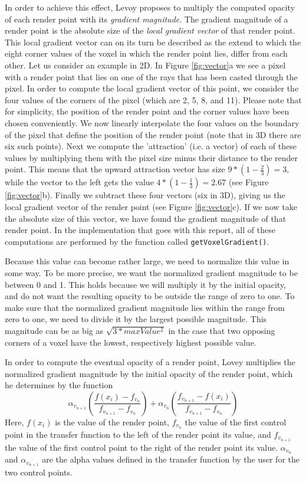 In order to achieve this effect, Levoy proposes to multiply the computed opacity of each render point with its \textit{gradient magnitude}. The gradient magnitude of a render point is the absolute size of the \textit{local gradient vector} of that render point. This local gradient vector can on its turn be described as the extend to which the eight corner values of the voxel in which the render point lies, differ from each other. Let us consider an example in 2D. In Figure \ref{fig:vector}a we see a pixel with a render point that lies on one of the rays that has been casted through the pixel. In order to compute the local gradient vector of this point, we consider the four values of the corners of the pixel (which are 2, 5, 8, and 11). Please note that for simplicity, the position of the render point and the corner values have been chosen conveniently. We now linearly interpolate the four values on the boundary of the pixel that define the position of the render point (note that in 3D there are six such points). Next we compute the 'attraction' (i.e. a vector) of each of these values by multiplying them with the pixel size minus their distance to the render point. This means that the upward attraction vector has size $9*(1-\frac{2}{3})=3$, while the vector to the left gets the value $4*(1-\frac{1}{3})=2.67$ (see Figure \ref{fig:vector}b). Finally we subtract these four vectors (six in 3D), giving us the local gradient vector of the render point (see Figure \ref{fig:vector}c). If we now take the absolute size of this vector, we have found the gradient magnitude of that render point. In the implementation that goes with this report, all of these computations are performed by the function called \texttt{getVoxelGradient()}.

Because this value can become rather large, we need to normalize this value in some way. To be more precise, we want the normalized gradient magnitude to be between 0 and 1. This holds because we will multiply it by the initial opacity, and do not want the resulting opacity to be outside the range of zero to one. To make sure that the normalized gradient magnitude lies within the range from zero to one, we need to divide it by the largest possible magnitude. This magnitude can be as big as $\sqrt{3*maxValue^2}$ in the case that two opposing corners of a voxel have the lowest, respectively highest possible value.

In order to compute the eventual opacity of a render point, Lovey multiplies the normalized gradient magnitude by the initial opacity of the render point, which he determines by the function
\[
\alpha_{v_{n+1}} \left(\frac{f(x_i)-f_{v_n}}{f_{v_{n+1}}-f_{v_n}}\right) + \alpha_{v_n} \left(\frac{f_{v_{n+1}}-f(x_i)}{f_{v_{n+1}}-f_{v_n}}\right)
\]
 Here, $f(x_i)$ is the value of the render point, $f_{v_n}$ the value of the first control point in the transfer function to the left of the render point its value, and $f_{v_{n+1}}$ the value of the first control point to the right of the render point its value. $\alpha_{v_n}$ and $\alpha_{v_{n+1}}$ are the alpha values defined in the transfer function by the user for the two control points.
 
